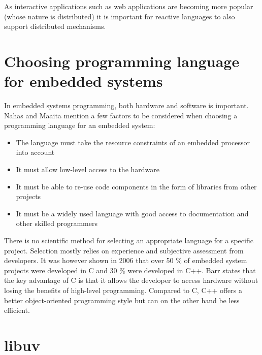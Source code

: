 As interactive applications such as web applications are becoming more popular
(whose nature is distributed) it is important for reactive languages to also
support distributed mechanisms.

\section{Choosing programming language for embedded systems}

In embedded systems programming, both hardware and software is important. Nahas
and Maaita \cite{nahas2012choosing} mention a few factors to be considered when
choosing a programming language for an embedded system:

\begin{itemize}
\item
  The language must take the resource constraints of an embedded processor
  into account
\item
  It must allow low-level access to the hardware
\item
  It must be able to re-use code components in the form of libraries from other
    projects
\item
  It must be a widely used language with good access to documentation and other
    skilled programmers
\end{itemize}

There is no scientific method for selecting an appropriate language for a
specific project. Selection mostly relies on experience and subjective
assessment from developers. It was however shown in 2006 that over 50 \% of
embedded system projects were developed in C and 30 \% were developed in C++.
Barr \cite{barr1999programming} states that the key advantage of C is that it
allows the developer to access hardware without losing the benefits of
high-level programming. Compared to C, C++ offers a better object-oriented
programming style but can on the other hand be less efficient.
\cite{nahas2012choosing}

\section{libuv}

